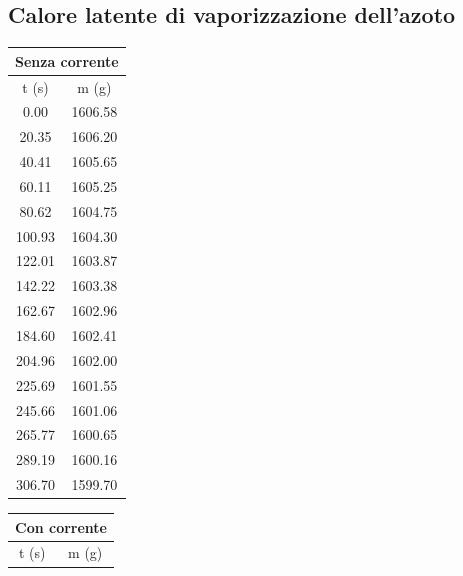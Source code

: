 \documentclass[a4paper,12pt]{article}
\begin{document}
\subsection{Calore latente di vaporizzazione dell'azoto}

\begin{table}[H]
    \centering
    \begin{minipage}[t]{0.30\textwidth}
        \vspace{0pt}
        \centering
        \begin{tabular}{|c|c|}
            \hline
            \multicolumn{2}{|c|}{\textbf{Senza corrente}} \\ \hline
            t (s) & m (g) \\ \hline
            0.00 & 1606.58 \\ \hline
            20.35 & 1606.20 \\ \hline
            40.41 & 1605.65 \\ \hline
            60.11 & 1605.25 \\ \hline
            80.62 & 1604.75 \\ \hline
            100.93 & 1604.30 \\ \hline
            122.01 & 1603.87 \\ \hline
            142.22 & 1603.38 \\ \hline
            162.67 & 1602.96 \\ \hline
            184.60 & 1602.41 \\ \hline
            204.96 & 1602.00 \\ \hline
            225.69 & 1601.55 \\ \hline
            245.66 & 1601.06 \\ \hline
            265.77 & 1600.65 \\ \hline
            289.19 & 1600.16 \\ \hline
            306.70 & 1599.70 \\ \hline
        \end{tabular}
    \end{minipage}
    \hfill
    \begin{minipage}[t]{0.30\textwidth}
        \vspace{0pt}
        \centering
        \begin{tabular}{|c|c|}
            \hline
            \multicolumn{2}{|c|}{\textbf{Con corrente}} \\ \hline
            t (s) & m (g) \\ \hline

\end{tabular}
\end{minipage}
\end{table}
\end{document}
